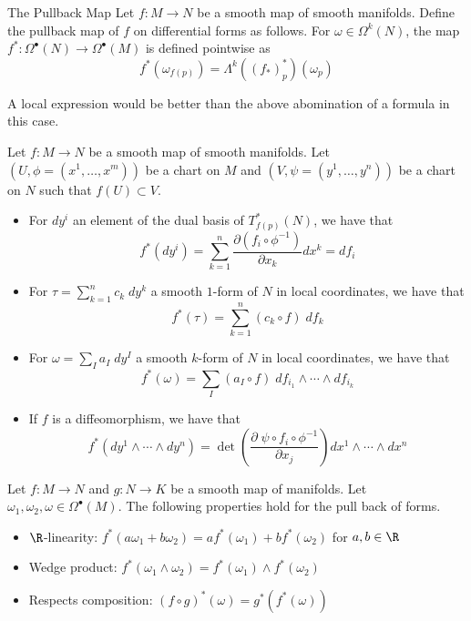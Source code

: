 \documentclass[a4paper]{article}
\begin{document}
\begin{defn}{The Pullback Map}{} Let $f:M\to N$ be a smooth map of smooth manifolds. Define the pullback map of $f$ on differential forms as follows. For $\omega\in\Omega^k(N)$, the map $f^\ast:\Omega^\bullet(N)\to\Omega^\bullet(M)$ is defined pointwise as  $$f^\ast(\omega_{f(p)})=\Lambda^k((f_\ast)_p^\ast)(\omega_p)$$
\end{defn}

A local expression would be better than the above abomination of a formula in this case. 

\begin{thm}{}{} Let $f:M\to N$ be a smooth map of smooth manifolds. Let $(U,\phi=(x^1,\dots,x^m))$ be a chart on $M$ and $(V,\psi=(y^1,\dots,y^n))$ be a chart on $N$ such that $f(U)\subset V$. 
\begin{itemize}
\item For $dy^i$ an element of the dual basis of $T_{f(p)}^\ast(N)$, we have that $$f^\ast(dy^i)=\sum_{k=1}^n\frac{\partial(f_i\circ\phi^{-1})}{\partial x_k}dx^k=df_i$$
\item For $\tau=\sum_{k=1}^n c_k\;dy^k$ a smooth $1$-form of $N$ in local coordinates, we have that $$f^\ast(\tau)=\sum_{k=1}^n(c_k\circ f)\;df_k$$
\item For $\omega=\sum_Ia_I\;dy^I$ a smooth $k$-form of $N$ in local coordinates, we have that $$f^\ast(\omega)=\sum_I(a_I\circ f)\;df_{i_1}\wedge\cdots\wedge df_{i_k}$$
\item If $f$ is a diffeomorphism, we have that $$f^\ast(dy^1\wedge\cdots\wedge dy^n)=\det\left(\frac{\partial\;\psi\circ f_i\circ\phi^{-1}}{\partial x_j}\right)dx^1\wedge\cdots\wedge dx^n$$
\end{itemize}
\end{thm}

\begin{prp}{}{} Let $f:M\to N$ and $g:N\to K$ be a smooth map of manifolds. Let $\omega_1,\omega_2,\omega\in\Omega^\bullet(M)$. The following properties hold for the pull back of forms. 
\begin{itemize}
\item $\R$-linearity: $f^\ast(a\omega_1+b\omega_2)=af^\ast(\omega_1)+bf^\ast(\omega_2)$ for $a,b\in\R$
\item Wedge product: $f^\ast(\omega_1\wedge\omega_2)=f^\ast(\omega_1)\wedge f^\ast(\omega_2)$
\item Respects composition: $(f\circ g)^\ast(\omega)=g^\ast(f^\ast(\omega))$
\end{itemize}
\end{prp}
\end{document}
